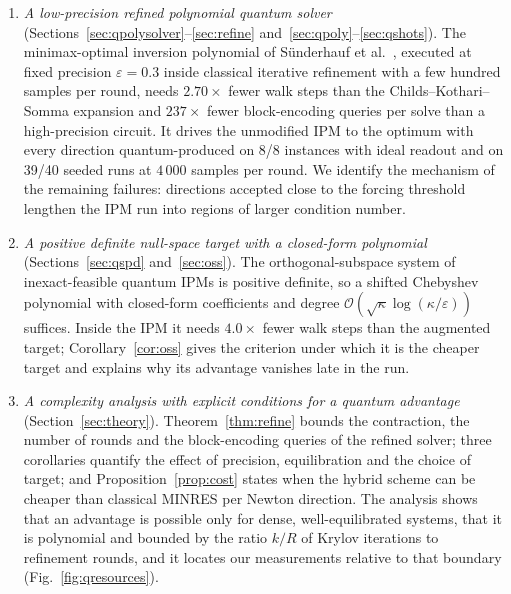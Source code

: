 \documentclass[11pt]{article}
\theoremstyle{definition}
\newcommand{\eps}{\varepsilon}
\newcommand{\bigO}{\mathcal{O}}
\begin{document}
\begin{enumerate}[leftmargin=2.2em,label=\textbf{C\arabic*.}]
\item \emph{A low-precision refined polynomial quantum solver} (Sections~\ref{sec:qpolysolver}--\ref{sec:refine} and~\ref{sec:qpoly}--\ref{sec:qshots}). The minimax-optimal inversion polynomial of S\"underhauf et al.~\cite{sunderhauf2025polynomials}, executed at fixed precision $\eps=0.3$ inside classical iterative refinement with a few hundred samples per round, needs $2.70\times$ fewer walk steps than the Childs--Kothari--Somma expansion and $237\times$ fewer block-encoding queries per solve than a high-precision circuit. It drives the unmodified IPM to the optimum with every direction quantum-produced on 8/8 instances with ideal readout and on 39/40 seeded runs at $4\,000$ samples per round. We identify the mechanism of the remaining failures: directions accepted close to the forcing threshold lengthen the IPM run into regions of larger condition number.
\item \emph{A positive definite null-space target with a closed-form polynomial} (Sections~\ref{sec:qspd} and~\ref{sec:oss}). The orthogonal-subspace system of inexact-feasible quantum IPMs is positive definite, so a shifted Chebyshev polynomial with closed-form coefficients and degree $\bigO(\sqrt{\kappa}\log(\kappa/\eps))$ suffices. Inside the IPM it needs $4.0\times$ fewer walk steps than the augmented target; Corollary~\ref{cor:oss} gives the criterion under which it is the cheaper target and explains why its advantage vanishes late in the run.
\item \emph{A complexity analysis with explicit conditions for a quantum advantage} (Section~\ref{sec:theory}). Theorem~\ref{thm:refine} bounds the contraction, the number of rounds and the block-encoding queries of the refined solver; three corollaries quantify the effect of precision, equilibration and the choice of target; and Proposition~\ref{prop:cost} states when the hybrid scheme can be cheaper than classical MINRES per Newton direction. The analysis shows that an advantage is possible only for dense, well-equilibrated systems, that it is polynomial and bounded by the ratio $k/R$ of Krylov iterations to refinement rounds, and it locates our measurements relative to that boundary (Fig.~\ref{fig:qresources}).
\end{enumerate}
\end{document}
